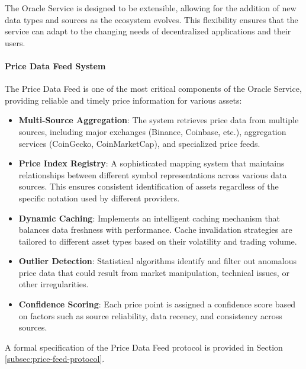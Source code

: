 The Oracle Service is designed to be extensible, allowing for the addition of new data types and sources as the ecosystem evolves. This flexibility ensures that the service can adapt to the changing needs of decentralized applications and their users.



\paragraph{Price Data Feed System}
The Price Data Feed is one of the most critical components of the Oracle Service, providing reliable and timely price information for various assets:

\begin{itemize}
    \item \textbf{Multi-Source Aggregation}: The system retrieves price data from multiple sources, including major exchanges (Binance, Coinbase, etc.), aggregation services (CoinGecko, CoinMarketCap), and specialized price feeds.
    
    \item \textbf{Price Index Registry}: A sophisticated mapping system that maintains relationships between different symbol representations across various data sources. This ensures consistent identification of assets regardless of the specific notation used by different providers.
    
    \item \textbf{Dynamic Caching}: Implements an intelligent caching mechanism that balances data freshness with performance. Cache invalidation strategies are tailored to different asset types based on their volatility and trading volume.
    
    \item \textbf{Outlier Detection}: Statistical algorithms identify and filter out anomalous price data that could result from market manipulation, technical issues, or other irregularities.
    
    \item \textbf{Confidence Scoring}: Each price point is assigned a confidence score based on factors such as source reliability, data recency, and consistency across sources.
\end{itemize}

A formal specification of the Price Data Feed protocol is provided in Section \ref{subsec:price-feed-protocol}.



